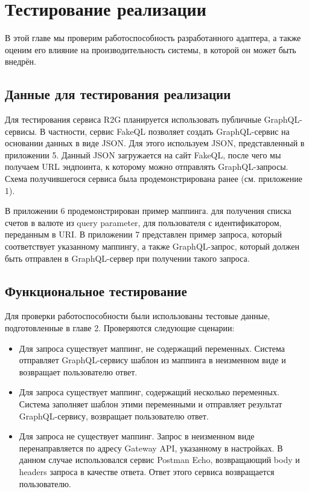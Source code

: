 \chapter{Тестирование реализации} \label{ch:ch4}

В этой главе мы проверим работоспособность разработанного адаптера, а также оценим его влияние на производительность системы, в которой он может быть внедрён.

\section{Данные для тестирования реализации}\label{sec:ch4-testing-data}

Для тестирования сервиса R2G планируется использовать публичные GraphQL-сервисы.
В частности, сервис FakeQL позволяет создать GraphQL-сервис на основании данных в виде JSON. Для этого используем JSON, представленный в приложении 5.
Данный JSON загружается на сайт FakeQL, после чего мы получаем URL эндпоинта, к которому можно отправлять GraphQL-запросы.
Схема получившегося сервиса была продемонстрирована ранее (см. приложение 1).

В приложении 6 продемонстрирован пример маппинга. %
для получения списка счетов в валюте из query parameter, для пользователя с идентификатором, переданным в URI. В приложении 7 представлен пример запроса, который соответствует указанному маппингу, а также GraphQL-запрос, который должен быть отправлен в GraphQL-сервер при получении такого запроса.

\section{Функциональное тестирование} \label{sec:ch4-functional}

	Для проверки работоспособности были использованы тестовые данные, подготовленные в главе 2.
	Проверяются следующие сценарии:

\begin{itemize}
	\item Для запроса существует маппинг, не содержащий переменных.
	Система отправляет GraphQL-сервису шаблон из маппинга в неизменном виде и возвращает пользователю ответ.

	\item Для запроса существует маппинг, содержащий несколько переменных.
	Система заполняет шаблон этими переменными и отправляет результат GraphQL-сервису, возвращает пользователю ответ.

    \item Для запроса не существует маппинг.
	Запрос в неизменном виде перенаправляется по адресу Gateway API, указанному в настройках.
	В данном случае использовался сервис Postman Echo, возвращающий body и headers запроса в качестве ответа.
	Ответ этого сервиса возвращается пользователю.
\end{itemize}


